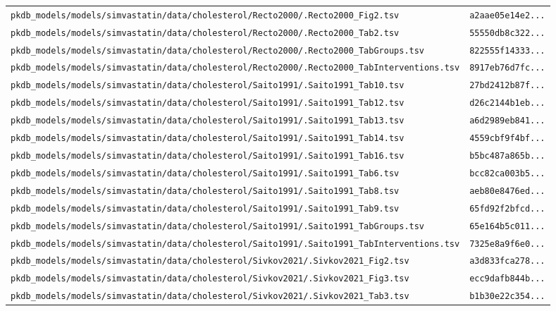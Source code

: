 \documentclass{article}
\begin{document}
\begin{longtable}{ll}
\texttt{pkdb\_models/models/simvastatin/data/cholesterol/Recto2000/.Recto2000\_Fig2.tsv} & \texttt{a2aae05e14e2...} \\
\texttt{pkdb\_models/models/simvastatin/data/cholesterol/Recto2000/.Recto2000\_Tab2.tsv} & \texttt{55550db8c322...} \\
\texttt{pkdb\_models/models/simvastatin/data/cholesterol/Recto2000/.Recto2000\_TabGroups.tsv} & \texttt{822555f14333...} \\
\texttt{pkdb\_models/models/simvastatin/data/cholesterol/Recto2000/.Recto2000\_TabInterventions.tsv} & \texttt{8917eb76d7fc...} \\
\texttt{pkdb\_models/models/simvastatin/data/cholesterol/Saito1991/.Saito1991\_Tab10.tsv} & \texttt{27bd2412b87f...} \\
\texttt{pkdb\_models/models/simvastatin/data/cholesterol/Saito1991/.Saito1991\_Tab12.tsv} & \texttt{d26c2144b1eb...} \\
\texttt{pkdb\_models/models/simvastatin/data/cholesterol/Saito1991/.Saito1991\_Tab13.tsv} & \texttt{a6d2989eb841...} \\
\texttt{pkdb\_models/models/simvastatin/data/cholesterol/Saito1991/.Saito1991\_Tab14.tsv} & \texttt{4559cbf9f4bf...} \\
\texttt{pkdb\_models/models/simvastatin/data/cholesterol/Saito1991/.Saito1991\_Tab16.tsv} & \texttt{b5bc487a865b...} \\
\texttt{pkdb\_models/models/simvastatin/data/cholesterol/Saito1991/.Saito1991\_Tab6.tsv} & \texttt{bcc82ca003b5...} \\
\texttt{pkdb\_models/models/simvastatin/data/cholesterol/Saito1991/.Saito1991\_Tab8.tsv} & \texttt{aeb80e8476ed...} \\
\texttt{pkdb\_models/models/simvastatin/data/cholesterol/Saito1991/.Saito1991\_Tab9.tsv} & \texttt{65fd92f2bfcd...} \\
\texttt{pkdb\_models/models/simvastatin/data/cholesterol/Saito1991/.Saito1991\_TabGroups.tsv} & \texttt{65e164b5c011...} \\
\texttt{pkdb\_models/models/simvastatin/data/cholesterol/Saito1991/.Saito1991\_TabInterventions.tsv} & \texttt{7325e8a9f6e0...} \\
\texttt{pkdb\_models/models/simvastatin/data/cholesterol/Sivkov2021/.Sivkov2021\_Fig2.tsv} & \texttt{a3d833fca278...} \\
\texttt{pkdb\_models/models/simvastatin/data/cholesterol/Sivkov2021/.Sivkov2021\_Fig3.tsv} & \texttt{ecc9dafb844b...} \\
\texttt{pkdb\_models/models/simvastatin/data/cholesterol/Sivkov2021/.Sivkov2021\_Tab3.tsv} & \texttt{b1b30e22c354...} \\

\end{longtable}
\end{document}

